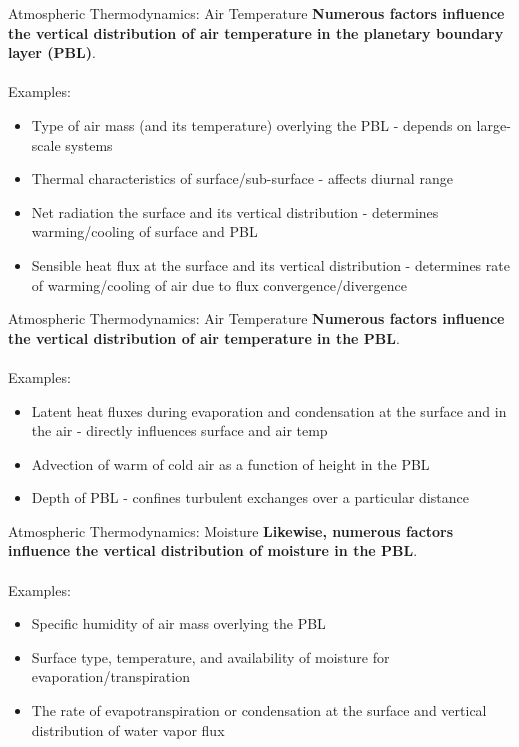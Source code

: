 \begin{frame}{Atmospheric Thermodynamics: Air Temperature}
\textbf{Numerous factors influence the vertical distribution of air temperature in the planetary boundary layer (PBL)}. ~\\~\\
Examples:
\begin{itemize}
	\item Type of air mass (and its temperature) overlying the PBL - depends on large-scale systems
	\item Thermal characteristics of surface/sub-surface - affects diurnal range
	\item Net radiation the surface and its vertical distribution - determines warming/cooling of surface and PBL
	\item Sensible heat flux at the surface and its vertical distribution - determines rate of warming/cooling of air due to flux convergence/divergence
\end{itemize}
\end{frame}

\begin{frame}{Atmospheric Thermodynamics: Air Temperature}
\textbf{Numerous factors influence the vertical distribution of air temperature in the PBL}. ~\\~\\
Examples:
\begin{itemize}
	\item Latent heat fluxes during evaporation and condensation at the surface and in the air - directly influences surface and air temp
	\item Advection of warm of cold air as a function of height in the PBL
	\item Depth of PBL - confines turbulent exchanges over a particular distance 
\end{itemize}
\end{frame}


\begin{frame}{Atmospheric Thermodynamics: Moisture}
\textbf{Likewise, numerous factors influence the vertical distribution of moisture in the PBL}. ~\\~\\
Examples:
\begin{itemize}
	\item Specific humidity of air mass overlying the PBL
	\item Surface type, temperature, and availability of moisture for evaporation/transpiration
	\item The rate of evapotranspiration or condensation at the surface and vertical distribution of water vapor flux 
\end{itemize}
\end{frame}

